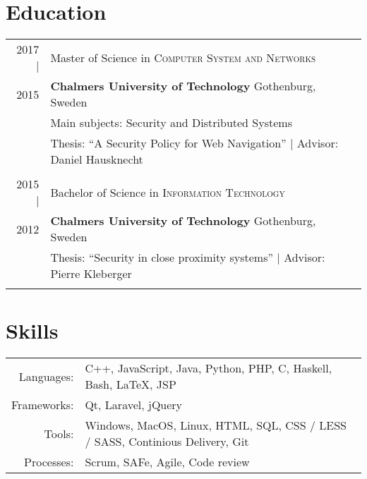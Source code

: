 \documentclass[a4paper,10pt]{scrartcl} %
\begin{document}

\section{Education}

\begin{tabular}{r|p{15cm}}	
2017 |	        & Master of Science in \textsc{Computer System and Networks} \\
2015			        & \textbf{Chalmers University of Technology} \hfill Gothenburg, Sweden \\
\phantom{abcdefghijklm}	& Main subjects: Security and Distributed Systems \\
				        & Thesis: ``A Security Policy for Web Navigation'' | \small Advisor: Daniel Hausknecht \\
\multicolumn{2}{c}{} \\


2015 |      	& Bachelor of Science in \textsc{Information Technology} \\
2012			& \textbf{Chalmers University of Technology} \hfill Gothenburg, Sweden \\
				& Thesis: ``Security in close proximity systems'' | \small Advisor: Pierre Kleberger \\
\multicolumn{2}{c}{} \\

\end{tabular}


\section{Skills}

\begin{tabular}{rp{15cm}}
\phantom{abcde} Languages: 		    & C++, JavaScript, Java, Python, PHP, C, Haskell, Bash, \LaTeX, JSP \\
Frameworks:	                        & Qt, Laravel, jQuery \\
Tools:	                            & Windows, MacOS, Linux, HTML, SQL, CSS / LESS / SASS, Continious Delivery, Git \\
Processes:                          & Scrum, SAFe, Agile, Code review 
\end{tabular}


\newpage
\end{document}
